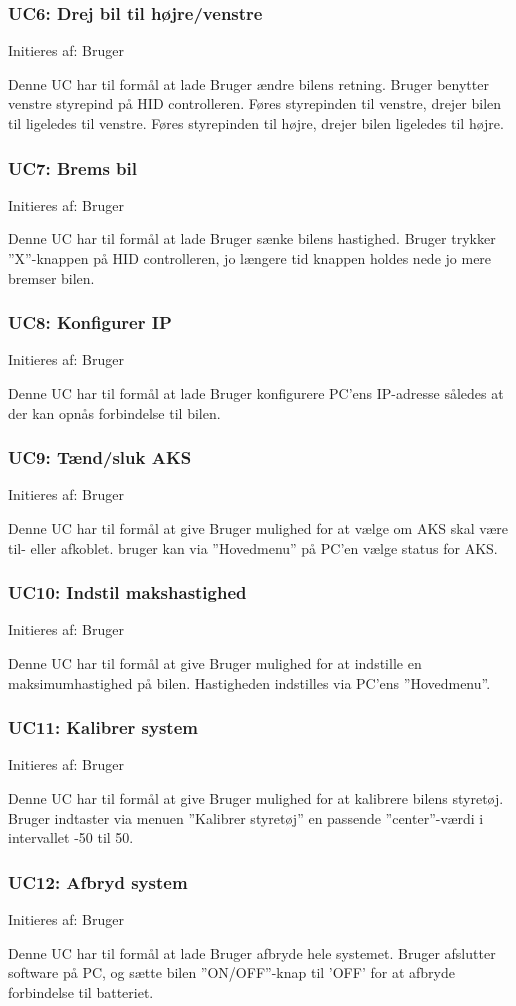\subsubsection{UC6: Drej bil til højre/venstre}
Initieres af: Bruger

Denne UC har til formål at lade Bruger ændre bilens retning. Bruger benytter venstre styrepind på HID controlleren. Føres styrepinden til venstre, drejer bilen til ligeledes til venstre. Føres styrepinden til højre, drejer bilen ligeledes til højre. 


\subsubsection{UC7: Brems bil}
Initieres af: Bruger

Denne UC har til formål at lade Bruger sænke bilens hastighed. Bruger trykker ''X''-knappen på HID controlleren, jo længere tid knappen holdes nede jo mere bremser bilen. 


\subsubsection{UC8: Konfigurer IP}
Initieres af: Bruger

Denne UC har til formål at lade Bruger konfigurere PC'ens IP-adresse således at der kan opnås forbindelse til bilen.  


\subsubsection{UC9: Tænd/sluk AKS}
Initieres af: Bruger

Denne UC har til formål at give Bruger mulighed for at vælge om AKS skal være til- eller afkoblet. bruger kan via ''Hovedmenu'' på PC'en vælge status for AKS. 


\subsubsection{UC10: Indstil makshastighed}
Initieres af: Bruger

Denne UC har til formål at give Bruger mulighed for at indstille en maksimumhastighed på bilen. Hastigheden indstilles via PC'ens ''Hovedmenu''.


\subsubsection{UC11: Kalibrer system}
Initieres af: Bruger

Denne UC har til formål at give Bruger mulighed for at kalibrere bilens styretøj. Bruger indtaster via menuen ''Kalibrer styretøj'' en passende ''center''-værdi i intervallet -50 til 50.  


\subsubsection{UC12: Afbryd system}
Initieres af: Bruger

Denne UC har til formål at lade Bruger afbryde hele systemet. Bruger afslutter software på PC, og sætte bilen ''ON/OFF''-knap til 'OFF' for at afbryde forbindelse til batteriet. 
